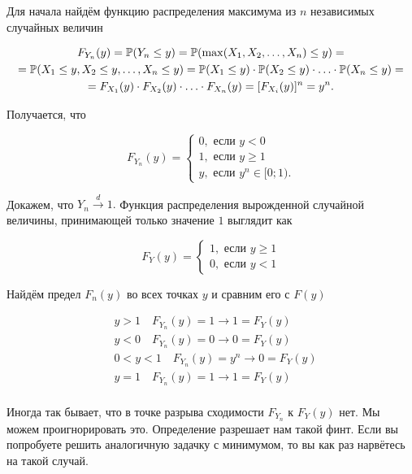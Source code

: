 \documentclass[12pt, a4paper, oneside]{article}
\begin{document}
\begin{sol}
Для начала найдём функцию распределения максимума из $n$ независимых случайных величин 

\begin{multline*} 
F_{Y_n}(y) = \mathbb{P}(Y_n \le y) = \mathbb{P}(\max(X_1, X_2, \ldots, X_n) \le y) = \\ = \mathbb{P}(X_1 \le y, X_2 \le y, \ldots, X_n \le y) = \mathbb{P}(X_1 \le y) \cdot \mathbb{P}(X_2 \le y) \cdot \ldots \cdot \mathbb{P}(X_n \le y) = \\ = F_{X_1}(y) \cdot F_{X_2}(y) \cdot \ldots \cdot F_{X_n}(y) = [F_{X_i}(y)]^n = y^n.
\end{multline*} 

Получается, что 

\begin{equation*} 
F_{Y_n}(y) = \begin{cases}0, \text{ если } y < 0 \\ 1, \text{ если } y \ge 1 \\ y, \text{ если } y^n \in [0; 1).    \end{cases}
\end{equation*}

Докажем, что $Y_n \overset{d}{\to} 1.$ Функция распределения вырожденной случайной величины, принимающей только значение $1$ выглядит как 

\begin{equation*} 
F_{Y}(y) = \begin{cases}1, \text{ если } y \ge 1 \\ 0, \text{ если } y < 1 \end{cases}
\end{equation*}

Найдём предел $F_n(y)$ во всех точках $y$ и сравним его с $F(y)$

\begin{equation*} 
\begin{aligned} 
& y > 1 \quad F_{Y_n}(y) = 1 \to 1 = F_{Y}(y) \\ 
& y < 0 \quad F_{Y_n}(y) = 0 \to 0 = F_{Y}(y) \\ 
& 0 < y < 1 \quad F_{Y_n}(y) = y^n \to 0 = F_{Y}(y) \\ 
& y = 1 \quad F_{Y_n}(y) = 1 \to 1 = F_{Y}(y) \\ 
\end{aligned} 
\end{equation*} 

Иногда так бывает, что в точке разрыва сходимости $F_{Y_n}$ к $F_Y(y)$ нет. Мы можем проигнорировать это. Определение разрешает нам такой финт. Если вы попробуете решить аналогичную задачку с минимумом, то вы как раз нарвётесь на такой случай.
\end{sol}
\end{document}

